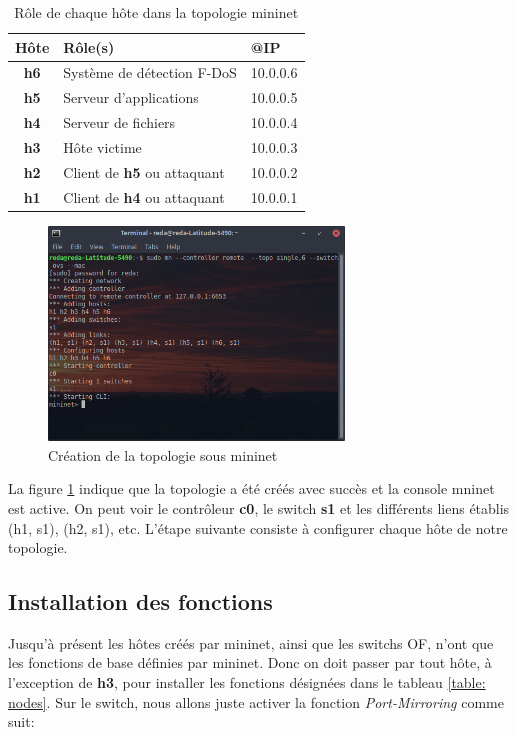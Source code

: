 \begin{table}
\begin{center}
\begin{tabular}{  | c || m{5cm} | m{3cm} | }
\hline
\rowcolor[rgb]{0.85,0.85,0.85}
Hôte & Rôle(s) & @IP\\
\hline
\textbf{h6} & Système de détection F-DoS & 10.0.0.6\\
\hline
\textbf{h5} & Serveur d'applications & 10.0.0.5\\
\hline
\textbf{h4} & Serveur de fichiers & 10.0.0.4\\
\hline
\textbf{h3} & Hôte victime & 10.0.0.3\\
\hline
\textbf{h2} & Client de \textbf{h5} ou attaquant & 10.0.0.2\\
\hline
\textbf{h1} & Client de \textbf{h4} ou attaquant & 10.0.0.1\\
\hline
\end{tabular}
\caption{Rôle de chaque hôte dans la topologie mininet}
\label{table:nodes}
\end{center}
\end{table}

\begin{figure}[h]
\centering
\includegraphics[width=0.7\textwidth]{Figures/simulation/mininet/start}
\decoRule
\caption{Création de la topologie sous mininet}
\label{fig:topologie}
\end{figure}

\newpage
La figure \ref{fig:topologie} indique que la topologie a été créés avec succès et la console mninet est active. On peut voir le contrôleur \textbf{c0}, le switch \textbf{s1} et les différents liens établis (h1, s1), (h2, s1), etc. L'étape suivante consiste à configurer chaque hôte de notre topologie.

\subsection{Installation des fonctions}
Jusqu'à présent les hôtes créés par mininet, ainsi que les switchs OF, n'ont que les fonctions de base définies par mininet. Donc on doit passer par tout hôte, à l'exception de \textbf{h3}, pour installer les fonctions désignées dans le tableau \ref{table: nodes}. Sur le switch, nous allons juste activer la fonction \textit{Port-Mirroring} comme suit:

